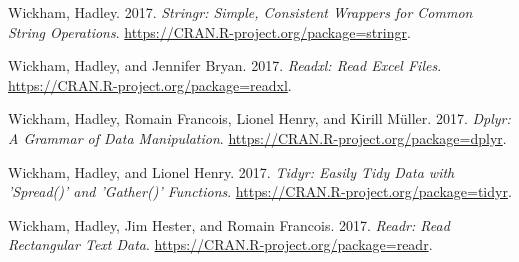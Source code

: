 \documentclass[
]{book}
\newlength{\cslhangindent}
\newlength{\cslentryspacingunit} %
\newenvironment{CSLReferences}[2] %
 {%
  \setlength{\parindent}{0pt}
  \ifodd #1
  \let\oldpar\par
  \def\par{\hangindent=\cslhangindent\oldpar}
  \fi
  \setlength{\parskip}{#2\cslentryspacingunit}
 }%
 {}
\begin{document}
\begin{CSLReferences}{1}{0}
\leavevmode{}%
Wickham, Hadley. 2017. \emph{Stringr: Simple, Consistent Wrappers for Common String Operations}. \url{https://CRAN.R-project.org/package=stringr}.

\leavevmode{}%
Wickham, Hadley, and Jennifer Bryan. 2017. \emph{Readxl: Read Excel Files}. \url{https://CRAN.R-project.org/package=readxl}.

\leavevmode{}%
Wickham, Hadley, Romain Francois, Lionel Henry, and Kirill Müller. 2017. \emph{Dplyr: A Grammar of Data Manipulation}. \url{https://CRAN.R-project.org/package=dplyr}.

\leavevmode{}%
Wickham, Hadley, and Lionel Henry. 2017. \emph{Tidyr: Easily Tidy Data with 'Spread()' and 'Gather()' Functions}. \url{https://CRAN.R-project.org/package=tidyr}.

\leavevmode{}%
Wickham, Hadley, Jim Hester, and Romain Francois. 2017. \emph{Readr: Read Rectangular Text Data}. \url{https://CRAN.R-project.org/package=readr}.

\end{CSLReferences}
\end{document}
